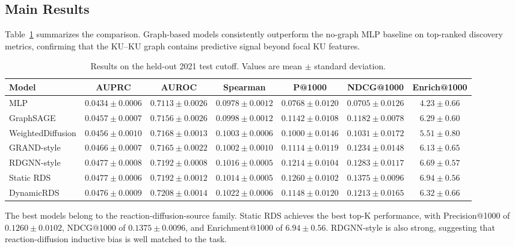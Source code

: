 \documentclass[conference]{IEEEtran}
\begin{document}
\subsection{Main Results}

Table~\ref{tab:main_results} summarizes the comparison. Graph-based models consistently outperform the no-graph MLP baseline on top-ranked discovery metrics, confirming that the KU--KU graph contains predictive signal beyond focal KU features.

\begin{table}[t]
\caption{Results on the held-out 2021 test cutoff. Values are mean $\pm$ standard deviation.}
\label{tab:main_results}
\centering
\small
\begin{tabular}{lcccccc}
\hline
Model & AUPRC & AUROC & Spearman & P@1000 & NDCG@1000 & Enrich@1000 \\
\hline
MLP
& $0.0434 \pm 0.0006$
& $0.7113 \pm 0.0026$
& $0.0978 \pm 0.0012$
& $0.0768 \pm 0.0120$
& $0.0705 \pm 0.0126$
& $4.23 \pm 0.66$ \\
GraphSAGE
& $0.0457 \pm 0.0007$
& $0.7156 \pm 0.0026$
& $0.0998 \pm 0.0012$
& $0.1142 \pm 0.0108$
& $0.1182 \pm 0.0078$
& $6.29 \pm 0.60$ \\
WeightedDiffusion
& $0.0456 \pm 0.0010$
& $0.7168 \pm 0.0013$
& $0.1003 \pm 0.0006$
& $0.1000 \pm 0.0146$
& $0.1031 \pm 0.0172$
& $5.51 \pm 0.80$ \\
GRAND-style
& $0.0466 \pm 0.0007$
& $0.7165 \pm 0.0022$
& $0.1002 \pm 0.0010$
& $0.1114 \pm 0.0119$
& $0.1234 \pm 0.0148$
& $6.13 \pm 0.65$ \\
RDGNN-style
& $0.0477 \pm 0.0008$
& $0.7192 \pm 0.0008$
& $0.1016 \pm 0.0005$
& $0.1214 \pm 0.0104$
& $0.1283 \pm 0.0117$
& $6.69 \pm 0.57$ \\
Static RDS
& $0.0477 \pm 0.0006$
& $0.7192 \pm 0.0012$
& $0.1014 \pm 0.0005$
& $\mathbf{0.1260 \pm 0.0102}$
& $\mathbf{0.1375 \pm 0.0096}$
& $\mathbf{6.94 \pm 0.56}$ \\
DynamicRDS
& $0.0476 \pm 0.0009$
& $\mathbf{0.7208 \pm 0.0014}$
& $\mathbf{0.1022 \pm 0.0006}$
& $0.1148 \pm 0.0120$
& $0.1213 \pm 0.0165$
& $6.32 \pm 0.66$ \\
\hline
\end{tabular}
\end{table}

The best models belong to the reaction-diffusion-source family. Static RDS achieves the best top-K performance, with Precision@1000 of $0.1260 \pm 0.0102$, NDCG@1000 of $0.1375 \pm 0.0096$, and Enrichment@1000 of $6.94 \pm 0.56$. RDGNN-style is also strong, suggesting that reaction-diffusion inductive bias is well matched to the task.
\end{document}
